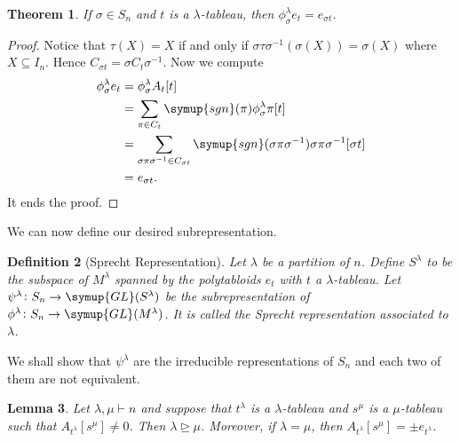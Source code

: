 \documentclass{assignment}[2019/10/15]
\theoremstyle{plain}
\newtheorem{theorem}{Theorem}[section]
\newtheorem{definition}[theorem]{Definition}
\newtheorem{lemma}[theorem]{Lemma}
\newcommand{\GL}{\mathop{}\!\symup{GL}}
\newcommand{\sgn}{\mathop{}\!\symup{sgn}}
\numberwithin{equation}{section}
\begin{document}
    \begin{theorem}\label{thm: poly-commu}
        If $\sigma\in S_n$ and $t$ is a $\lambda$-tableau, then $\phi_\sigma^\lambda e_t = e_{\sigma t}$.
    \end{theorem}

    \begin{proof}
        Notice that $\tau(X) = X$ if and only if $\sigma\tau\sigma^{-1}(\sigma(X)) = \sigma(X)$ where $X\subseteq I_n$. Hence $C_{\sigma t}=\sigma C_t\sigma^{-1}$. Now we compute
        \begin{equation}
            \begin{aligned}
                \phi_\sigma^\lambda e_t &= \phi_\sigma^\lambda A_t[t]\\
                &= \sum_{\pi\in C_t}\sgn(\pi)\phi_\sigma^\lambda \pi [t]\\
                &= \sum_{\sigma\pi\sigma^{-1}\in C_{\sigma t}}\sgn(\sigma\pi\sigma^{-1})\sigma\pi\sigma^{-1}[\sigma t]\\
                &= e_{\sigma t}.
            \end{aligned}
        \end{equation}
        It ends the proof.
    \end{proof}

    We can now define our desired subrepresentation.
    \begin{definition}[Sprecht Representation]
        Let $\lambda$ be a partition of $n$. Define $S^\lambda$ to be the subspace of $M^\lambda$ spanned by the polytabloids $e_t$ with $t$ a $\lambda$-tableau. Let $\psi^\lambda\colon S_n\to \GL(S^\lambda)$ be the subrepresentation of $\phi^\lambda\colon S_n\to \GL(M^\lambda)$. It is called the \emph{Sprecht representation} associated to $\lambda$.
    \end{definition}

    We shall show that $\psi^\lambda$ are the irreducible representations of $S_n$ and each two of them are not equivalent.

    \begin{lemma}\label{lem: Ats}
        Let $\lambda, \mu\vdash n$ and suppose that $t^\lambda$ is a $\lambda$-tableau and $s^\mu$ is a $\mu$-tableau such that $A_{t^\lambda}[s^\mu]\neq 0$. Then $\lambda\unrhd\mu$. Moreover, if $\lambda=\mu$, then $A_{t^\lambda}[s^\mu]=\pm e_{t^\lambda}$.
    \end{lemma}
\end{document}
